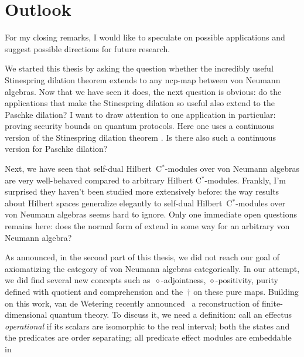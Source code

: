 
\chapter{Outlook}
\begin{parsec}%
\begin{point}%
For my closing remarks, I would like to speculate
    on possible applications
    and suggest possible
        directions for future research.

We started this thesis by asking the question
    whether the incredibly useful Stinespring dilation theorem
    extends to any ncp-map between von Neumann algebras.
Now that we have seen it does, the next question is obvious:
    do the applications that make the Stinespring dilation so useful
    also extend to the Paschke dilation?
I want to draw attention to one application in particular:
    proving security bounds on quantum protocols.
Here one uses a continuous version
    of the Stinespring dilation theorem \cite{werner2}.
Is there also such a continuous version for Paschke dilation?
\begin{point}%
Next, we have seen that self-dual Hilbert~C$^*$-modules
    over von Neumann algebras
    are very well-behaved compared
    to arbitrary Hilbert C$^*$-modules.
    Frankly, I'm surprised they haven't been studied
        more extensively before:
        the way results about Hilbert spaces
        generalize elegantly to self-dual Hilbert~C$^*$-modules
        over von Neumann algebras seems hard to ignore.
Only one immediate open questions remains here:
    does the normal form of 
    extend in some way for an arbitrary von Neumann algebra?
\end{point}
\begin{point}%
As announced, in the second part of this thesis, we did not reach
    our goal of axiomatizing the category of von Neumann algebras
    categorically.
In our attempt, we did find several new concepts
    such as~$\diamond$-adjointness, $\diamond$-positivity,
        purity defined with quotient and comprehension and
        the~$\dagger$ on these pure maps.
Building on this work,
    van de Wetering recently announced~\cite{wetering}
    a reconstruction of finite-dimensional quantum theory.
    To discuss it, we need a definition: call an effectus \emph{operational}
        if its scalars are isomorphic to the real interval;
        both the states and the predicates are order separating;
        all predicate effect modules are embeddable in

\end{point}
\end{point}
\end{parsec}
